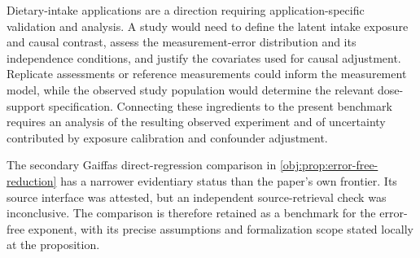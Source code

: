 Dietary-intake applications are a direction requiring application-specific validation and analysis. A study would need to define the latent intake exposure and causal contrast, assess the measurement-error distribution and its independence conditions, and justify the covariates used for causal adjustment. Replicate assessments or reference measurements could inform the measurement model, while the observed study population would determine the relevant dose-support specification. Connecting these ingredients to the present benchmark requires an analysis of the resulting observed experiment and of uncertainty contributed by exposure calibration and confounder adjustment.

The secondary Gaiffas direct-regression comparison in \cref{obj:prop:error-free-reduction} has a narrower evidentiary status than the paper's own frontier. Its source interface was attested, but an independent source-retrieval check was inconclusive. The comparison is therefore retained as a benchmark for the error-free exponent, with its precise assumptions and formalization scope stated locally at the proposition.
